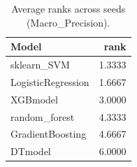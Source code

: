 \begin{table}[t]
\centering
\begin{tabular}{lr}
\toprule
Model & rank \\
\midrule
sklearn_SVM & 1.3333 \\
LogisticRegression & 1.6667 \\
XGBmodel & 3.0000 \\
random_forest & 4.3333 \\
GradientBoosting & 4.6667 \\
DTmodel & 6.0000 \\
\bottomrule
\end{tabular}
\caption{Average ranks across seeds (Macro_Precision).}
\label{tab:avg_rank_Macro_Precision}
\end{table}